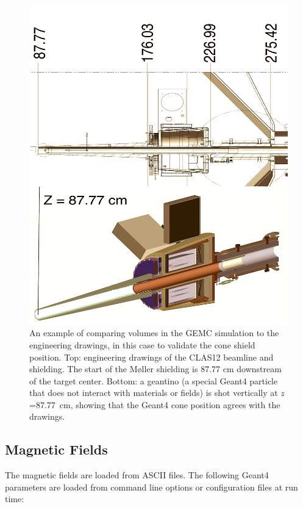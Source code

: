 \begin{figure}
	\centering
	\includegraphics[width=0.99\columnwidth,keepaspectratio]{img/cadValidationExample.png}
	\caption{An example of comparing volumes in the GEMC simulation to the engineering drawings, in this case to validate the cone shield
             position. Top: engineering drawings of the CLAS12 beamline and shielding. The start of the M\o ller shielding is 87.77 cm downstream
             of the target center. Bottom: a geantino (a special Geant4 particle that does not interact with materials or fields)
             is shot vertically at $z$=87.77~cm, showing that the Geant4 cone position agrees with the drawings.}
	\label{fig:cadValidationExample}
\end{figure}



\subsection{Magnetic Fields}
The magnetic fields are loaded from ASCII files. The following Geant4 parameters are loaded from
command line options or configuration files at run time:

